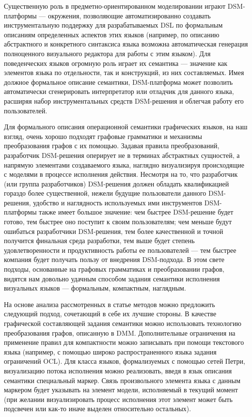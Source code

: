 \documentclass[a5paper]{article}
\begin{document}
Существенную роль в предметно-ориентированном моделировании играют DSM-платформы --- окружения, позволяющие автоматизированно создавать инструментальную поддержку для разрабатываемых DSL по формальным описаниям определенных аспектов этих языков (например, по описанию абстрактного и конкретного синтаксиса языка возможна автоматическая генерация полноценного визуального редактора для работы с этим языком). Для поведенческих языков огромную роль играет их семантика --- значение как элементов языка по отдельности, так и конструкций, из них составляемых. Имея должное формальное описание семантики, DSM-платформа может позволить автоматически сгенерировать интерпретатор или отладчик для данного языка, расширяя набор инструментальных средств DSM-решения и облегчая работу его пользователей.

Для формального описания операционной семантики графических языков, на наш взгляд, очень хорошо подходят графовые грамматики и механизмы преобразования графов с их помощью. Задавая правила преобразований, разработчик DSM-решения оперирует не в терминах абстрактных сущностей, а напрямую элементами создаваемого языка, наглядно визуализируя происходящие с моделями в процессе исполнения действия. Несмотря на то, что разработчик (или группа разработчиков) DSM-решения должен обладать квалификацией гораздо более существенной, нежели будущие пользователи данного DSM-решения, удобство и наглядность используемых ими инструментов DSM-платформы также имеет большое значение: чем быстрее DSM-решение будет готово, тем быстрее оно поступит к своим пользователям; чем меньше будут ошибаться разработчики DSM-решения, тем более качественной и точной получится финальная среда разработки, тем выше будет степень удовлетворенности и продуктивность работы ее пользователей --- тем быстрее компания будет получать пользу от внедрения DSM-подхода. В этом свете подходы, основанные на графовых грамматиках и преобразовании графов, видятся нам довольно удачным способом задания семантики исполнения визуальных языков --- формальным, компактным, наглядным.

На основе анализа рассмотренных в статье методов можно предложить следующий подход, сочетающий в себе их лучшие стороны. В качестве графической составляющей задания семантики можно использовать технологию преобразования графов, описанную в DMM. Дополнительные ограничения на применение правил для компактности можно записывать при помощи текстового языка (например, с помощью широко распространенного языка задания ограничений OCL). Для класса языков, формализуемых с помощью сетей Петри, визуализацию потока исполнения можно реализовать, введя в язык описания семантики специальный маркер. Связь произвольного элемента языка с данным маркером будет указывать на элемент модели, исполняемый в текущий момент (при желании визуализировать процесс исполнения этот элемент может быть подсвечен или как-то иначе выделен относительно остальных). 
\end{document}
